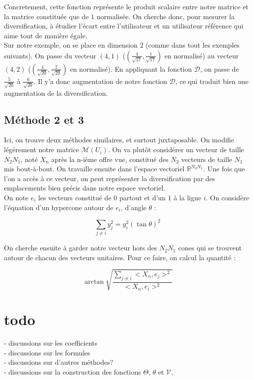\documentclass[11pt, oneside]{article}
\begin{document}
Concretement, cette fonction représente le produit scalaire entre notre matrice et la matrice constituée que de $1$ normalisée. On cherche donc, pour mesurer la diversification, à étudier l'écart entre l'utilisateur et un utilisateur référence qui aime tout de manière égale. \\

Sur notre exemple, on se place en dimension $2$ (comme dans tout les exemples suivants). On passe du vecteur $(4,1)$ ($(\frac{4}{\sqrt{17}},\frac{1}{\sqrt{17}})$ en normalisé) au vecteur $(4,2)$ ($(\frac{4}{\sqrt{20}},\frac{2}{\sqrt{20}})$ en normalisé). En appliquant la fonction $\mathcal{D}$, on passe de $\frac{5}{\sqrt{20}}$ à $\frac{6}{\sqrt{20}}$. Il y'a donc augmentation de notre fonction $\mathcal{D}$, ce qui traduit bien une augmentation de la diversification. 



\subsection{Méthode 2 et 3}

Ici, on trouve deux méthodes similaires, et surtout juxtaposable. On modifie légérement notre matrice $\mathcal{M} (U_i)$. On va plutôt considérer un vecteur de taille $N_2 N_1$, noté $X_n$ après la n-ième offre vue, constitué des $N_2$ vecteurs de taille $N_1$ mis bout-à-bout. On travaille ensuite dans l'espace vectoriel $\mathbb{R}^{N_2 N_1}$. Une fois que l'on a accès à ce vecteur, on peut représenter la diversification par des emplacements bien précis dans notre espace vectoriel. \\
On note $e_i$ les vecteurs constitué de $0$ partout et d'un $1$ à la ligne $i$. On considère l'équation d'un hypercone autour de $e_i$, d'angle $\theta$ :

\begin{center}

\[
\displaystyle \sum _{j \neq i} y_j ^2 = y_i ^2 (\tan{\theta}) ^2
\]

On cherche ensuite à garder notre vecteur hors des $N_2 N_1$ cones qui se trouvent autour de chacun des vecteurs unitaires. Pour ce faire, on calcul la quantité :
\end{center}


\begin{center}
\[
\arctan{\sqrt{\frac{\displaystyle \sum _{j \neq i} <X_n,e_j> ^2}{<X_n,e_i> ^2}}}
\]

\end{center}


\section{todo}

- discussions sur les coefficients \\
- discussions sur les formules \\
- discussions sur d'autres méthodes? \\
- discussions sur la construction des fonctions $\Theta$, $\theta$ et $\mathcal{V}$.
\end{document}
